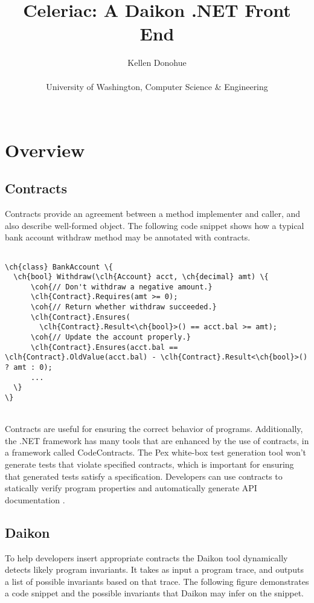 \documentclass{article}
\title{Celeriac: A Daikon .NET Front End}
\author{Kellen Donohue\\ \\
University of Washington, Computer Science \& Engineering\\ \\}
\newcommand\ch[1]{\textcolor[rgb]{0,0,1}{\textbf{#1}}}
\newcommand\clh[1]{\textcolor[rgb]{0,.5,1}{\textbf{#1}}}
\newcommand\coh[1]{\textcolor[rgb]{0,.6,0}{\textbf{#1}}}
\begin{document}
\maketitle

\section{Overview}
\subsection{Contracts}
Contracts provide an agreement between a method implementer and caller, and also describe well-formed object. The following code snippet shows how a typical bank account withdraw method may be annotated with contracts.
\begin{center}
\begin{Verbatim}[commandchars=\\\{\}]

\ch{class} BankAccount \{
  \ch{bool} Withdraw(\clh{Account} acct, \ch{decimal} amt) \{
      \coh{// Don't withdraw a negative amount.}
      \clh{Contract}.Requires(amt >= 0);
      \coh{// Return whether withdraw succeeded.}
      \clh{Contract}.Ensures(
        \clh{Contract}.Result<\ch{bool}>() == acct.bal >= amt);
      \coh{// Update the account properly.}
      \clh{Contract}.Ensures(acct.bal == \clh{Contract}.OldValue(acct.bal) - \clh{Contract}.Result<\ch{bool}>() ? amt : 0);
      ...
  \}
\}
\end{Verbatim}
\end{center} 
\  \\
Contracts are useful for ensuring the correct behavior of programs. Additionally, the .NET framework has many tools that are enhanced by the use of contracts, in a framework called CodeContracts. The Pex white-box test generation tool \cite{pex} won't generate tests that violate specified contracts, which is important for ensuring that generated tests satisfy a specification. Developers can use contracts to statically verify program properties \cite{static} and automatically generate API documentation \cite{contracts}.

\subsection{Daikon}
To help developers insert appropriate contracts the Daikon tool \cite{daikon} dynamically detects likely program invariants. It takes as input a program trace, and outputs a list of possible invariants based on that trace.  The following figure demonstrates a code snippet and the possible invariants that Daikon may infer on the snippet.
\end{document}
